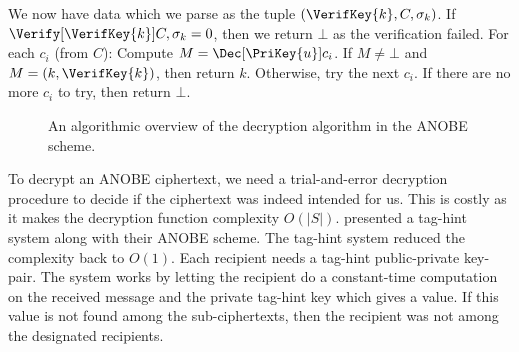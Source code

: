 We now have data which we parse as the tuple \((\VerifKey{k}, C, \sigma_k)\).
If \(\Verify[\VerifKey{k}]{ C, \sigma_k } = 0\), then we return \(\bot\) as the 
verification failed.
For each \(c_i\) (from \(C\)):
Compute \(M = \Dec[\PriKey{u}]{ c_i }\).
If \(M \neq \bot\) and \(M = (k, \VerifKey{k})\), then return \(k\).
Otherwise, try the next \(c_i\).
If there are no more \(c_i\) to try, then return \(\bot\).

\begin{frame}
  \begin{figure}
    \caption{%
      An algorithmic overview of the decryption algorithm in the \ac{ANOBE} 
      scheme.
    }\label{DecANOBE}
  \end{figure}
\end{frame}

To decrypt an \ac{ANOBE} ciphertext, we need a trial-and-error decryption 
procedure to decide if the ciphertext was indeed intended for us.
This is costly as it makes the decryption function complexity \(O(|S|)\).
\citet{ANOBE} presented a tag-hint system along with their \ac{ANOBE} scheme.
The tag-hint system reduced the complexity back to \(O(1)\).
Each recipient needs a tag-hint public-private key-pair.
The system works by letting the recipient do a constant-time computation on the 
received message and the private tag-hint key which gives a value.
If this value is not found among the sub-ciphertexts, then the recipient was 
not among the designated recipients.

